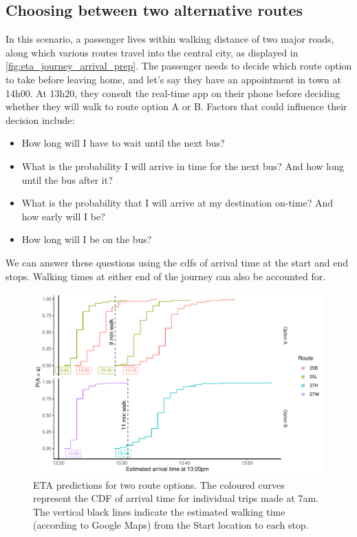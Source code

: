 \subsection{Choosing between two alternative routes}
\label{sec:journey_simple}

In this scenario, a passenger lives within walking distance of two major roads, along which various routes travel into the central city, as displayed in \cref{fig:eta_journey_arrival_prep}. The passenger needs to decide which route option to take before leaving home, and let's say they have an appointment in town at 14h00. At 13h20, they consult the real-time app on their phone before deciding whether they will walk to route option A or B. Factors that could influence their decision include:
\begin{itemize}
\item How long will I have to wait until the next bus?
\item What is the probability I will arrive in time for the next bus? And how long until the bus after it?
\item What is the probability that I will arrive at my destination on-time? And how early will I be?
\item How long will I be on the bus?
\end{itemize}
We can answer these questions using the \glspl{cdf} of arrival time at the start and end stops. Walking times at either end of the journey can also be accounted for.


\begin{knitrout}\small
{}\color{fgcolor}\begin{figure}

{\centering \includegraphics[width=\textwidth]{figure/eta_journey_arrival-1} 

}

\caption[ETA predictions for two route options]{ETA predictions for two route options. The coloured curves represent the CDF of arrival time for individual trips made at 7am. The vertical black lines indicate the estimated walking time (according to Google Maps) from the Start location to each stop.}\label{fig:eta_journey_arrival}
\end{figure}


\end{knitrout}




